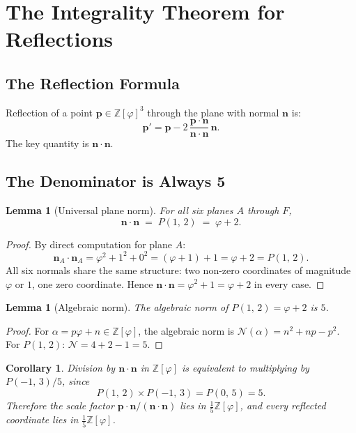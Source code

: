 \documentclass[12pt]{article}
\newtheorem{lemma}[theorem]{Lemma}
\newtheorem{corollary}[theorem]{Corollary}
\theoremstyle{definition}
\theoremstyle{remark}
\newcommand{\Zphi}{\mathbb{Z}[\varphi]}
\newcommand{\Phib}[2]{P(#1,\,#2)}
\begin{document}
\section{The Integrality Theorem for Reflections}
\label{sec:reflect}

\subsection{The Reflection Formula}

Reflection of a point $\mathbf{p}\in\Zphi^3$ through the plane with
normal $\mathbf{n}$ is:
\[
  \mathbf{p}' = \mathbf{p} - 2\,\frac{\mathbf{p}\cdot\mathbf{n}}
                                      {\mathbf{n}\cdot\mathbf{n}}\,\mathbf{n}.
\]
The key quantity is $\mathbf{n}\cdot\mathbf{n}$.

\subsection{The Denominator is Always 5}

\begin{lemma}[Universal plane norm]
\label{lem:norm}
For all six planes $A$ through $F$,
\[
  \mathbf{n}\cdot\mathbf{n} \;=\; \Phib{1}{2} \;=\; \varphi + 2.
\]
\end{lemma}

\begin{proof}
By direct computation for plane $A$:
\[
  \mathbf{n}_A\cdot\mathbf{n}_A
  = \varphi^2 + 1^2 + 0^2
  = (\varphi+1) + 1
  = \varphi + 2
  = \Phib{1}{2}.
\]
All six normals share the same structure: two non-zero coordinates of
magnitude $\varphi$ or $1$, one zero coordinate.  Hence
$\mathbf{n}\cdot\mathbf{n} = \varphi^2 + 1 = \varphi + 2$ in every case.
\end{proof}

\begin{lemma}[Algebraic norm]
\label{lem:algnorm}
The algebraic norm of $\Phib{1}{2} = \varphi+2$ is $5$.
\end{lemma}

\begin{proof}
For $\alpha = p\varphi + n \in \Zphi$, the algebraic norm is
$\mathcal{N}(\alpha) = n^2 + np - p^2$.
For $\Phib{1}{2}$: $\mathcal{N} = 4 + 2 - 1 = 5$.
\end{proof}

\begin{corollary}
\label{cor:denom5}
Division by $\mathbf{n}\cdot\mathbf{n}$ in $\Zphi$ is equivalent to
multiplying by $\Phib{-1}{3}/5$, since
\[
  \Phib{1}{2}\times\Phib{-1}{3} = \Phib{0}{5} = 5.
\]
Therefore the scale factor $\mathbf{p}\cdot\mathbf{n}/(\mathbf{n}\cdot\mathbf{n})$
lies in $\tfrac{1}{5}\Zphi$, and every reflected coordinate lies in
$\tfrac{1}{5}\Zphi$.
\end{corollary}
\end{document}
